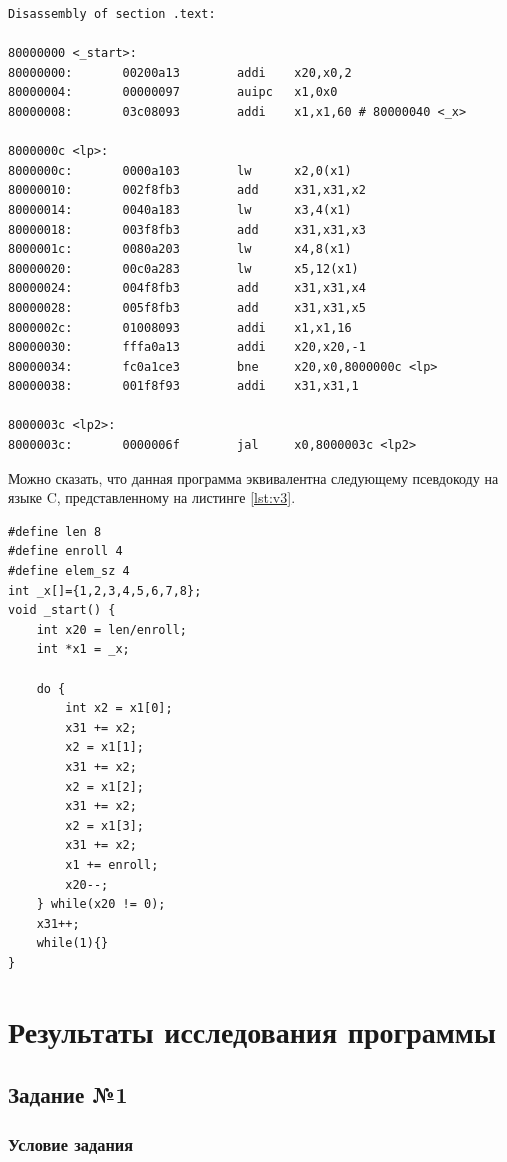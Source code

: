 \begin{lstlisting}[label=lst:v2,caption=Дизассемблированный код примера программы]
Disassembly of section .text:

80000000 <_start>:
80000000:       00200a13        addi    x20,x0,2
80000004:       00000097        auipc   x1,0x0
80000008:       03c08093        addi    x1,x1,60 # 80000040 <_x>

8000000c <lp>:
8000000c:       0000a103        lw      x2,0(x1)
80000010:       002f8fb3        add     x31,x31,x2
80000014:       0040a183        lw      x3,4(x1)
80000018:       003f8fb3        add     x31,x31,x3
8000001c:       0080a203        lw      x4,8(x1)
80000020:       00c0a283        lw      x5,12(x1)
80000024:       004f8fb3        add     x31,x31,x4
80000028:       005f8fb3        add     x31,x31,x5
8000002c:       01008093        addi    x1,x1,16
80000030:       fffa0a13        addi    x20,x20,-1
80000034:       fc0a1ce3        bne     x20,x0,8000000c <lp>
80000038:       001f8f93        addi    x31,x31,1

8000003c <lp2>:
8000003c:       0000006f        jal     x0,8000003c <lp2>
\end{lstlisting}

\clearpage

Можно сказать, что данная программа эквивалентна следующему псевдокоду на языке C, представленному на листинге \ref{lst:v3}.

\begin{lstlisting}[label=lst:v3,caption=Псевдокод общей программы]
#define len 8
#define enroll 4
#define elem_sz 4
int _x[]={1,2,3,4,5,6,7,8};
void _start() {
	int x20 = len/enroll;
	int *x1 = _x;
	
	do {
		int x2 = x1[0];
		x31 += x2;
		x2 = x1[1];
		x31 += x2;
		x2 = x1[2];
		x31 += x2;
		x2 = x1[3];
		x31 += x2;
		x1 += enroll;
		x20--;
	} while(x20 != 0);
	x31++;
	while(1){}
}
\end{lstlisting}

\chapter{Результаты исследования программы}

\section{Задание №1}

\subsection*{Условие задания}

